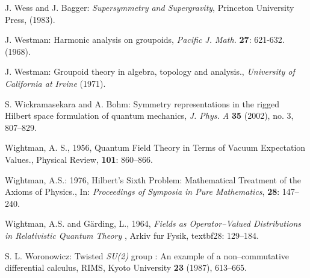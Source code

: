 \documentclass[12pt]{article}
\theoremstyle{plain}
\theoremstyle{definition}
\numberwithin{equation}{section}
\newcommand{\<}{{\langle}}
\begin{document}
\begin{thebibliography}{99}
J. Wess and J. Bagger: \emph{Supersymmetry and Supergravity},
Princeton University Press, (1983).

J. Westman: Harmonic analysis on groupoids, \textit{Pacific J. Math.} \textbf{27}: 621-632. (1968).


J. Westman: Groupoid theory in algebra, topology and analysis., \textit{University of California at Irvine} (1971).

S. Wickramasekara and A. Bohm: Symmetry representations in the rigged Hilbert space formulation of quantum mechanics, \emph{J. Phys. A} \textbf{35} (2002), no. 3, 807--829.


Wightman, A. S., 1956, Quantum Field Theory in Terms of Vacuum Expectation Values., Physical Review, \textbf{101}: 860--866.

Wightman, A.S.: 1976, Hilbert's Sixth Problem: Mathematical Treatment of the Axioms of Physics., In: 
\textit{Proceedings of Symposia in Pure Mathematics}, \textbf{28}: 147--240.

Wightman, A.S. and G\"arding, L., 1964, {\em Fields as Operator--Valued Distributions in 
Relativistic Quantum Theory} , Arkiv fur Fysik, textbf{28}: 129--184.


S. L. Woronowicz: Twisted \emph{SU(2)} group : An example of a non--commutative differential 
calculus, RIMS, Kyoto University \textbf{23} (1987), 613--665.

\end{thebibliography}
\end{document}
